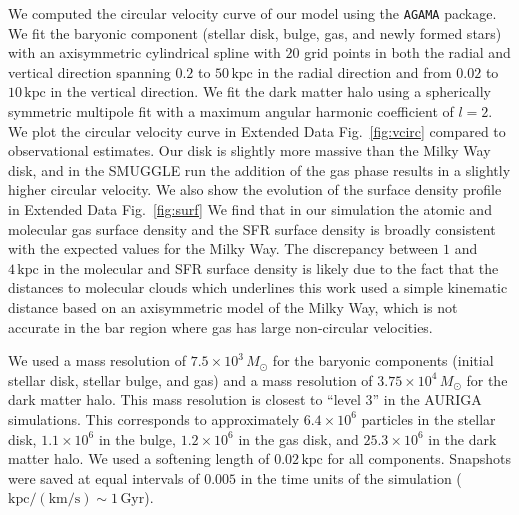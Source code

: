 \documentclass{natureprintstyle}
\begin{document}
We computed the circular velocity curve of our model using the \texttt{AGAMA}
package.\cite{2019MNRAS.482.1525V} We fit the baryonic component (stellar
disk, bulge, gas, and newly formed stars) with an axisymmetric cylindrical
spline with $20$ grid points in both the radial and vertical direction
spanning $0.2$ to $50\,\textrm{kpc}$ in the radial direction and from $0.02$
to $10\,\textrm{kpc}$ in the vertical direction. We fit the dark matter halo
using a spherically symmetric multipole fit with a maximum angular harmonic
coefficient of $l=2$. We plot the circular velocity curve in Extended Data
Fig.~\ref{fig:vcirc} compared to observational
estimates.\cite{2019ApJ...871..120E} Our disk is slightly more massive than
the Milky Way disk, and in the SMUGGLE run the addition of the gas phase
results in a slightly higher circular velocity. We also show the evolution of
the surface density profile in Extended Data Fig.~\ref{fig:surf} We find that
in our simulation the atomic and molecular gas surface density and the SFR
surface density is broadly consistent with the expected values for the Milky
Way.\cite{2008AA...487..951K,2022ApJ...929L..18E} The discrepancy between $1$
and $4\,\textrm{kpc}$ in the molecular and SFR surface density is likely due
to the fact that the distances to molecular clouds which underlines this work
used a simple kinematic distance based on an axisymmetric model of the Milky
Way,\cite{2017ApJ...834...57M} which is not accurate in the bar region
where gas has large non-circular velocities.

We used a mass resolution of $7.5\times10^3\,M_{\odot}$ for the baryonic
components (initial stellar disk, stellar bulge, and gas) and a mass
resolution of $3.75\times10^4\,M_{\odot}$ for the dark matter halo. This mass
resolution is closest to ``level 3'' in the AURIGA
simulations.\cite{2017MNRAS.467..179G} This corresponds to approximately
$6.4\times10^6$ particles in the stellar disk, $1.1\times10^6$ in the bulge,
$1.2\times10^6$ in the gas disk, and $25.3\times10^6$ in the dark matter halo.
We used a softening length of $0.02\,\textrm{kpc}$ for all components.
Snapshots were saved at equal intervals of $0.005$ in the time units of the
simulation ($\textrm{kpc}/(\textrm{km}/\textrm{s})\sim1\,\textrm{Gyr}$).
\end{document}
